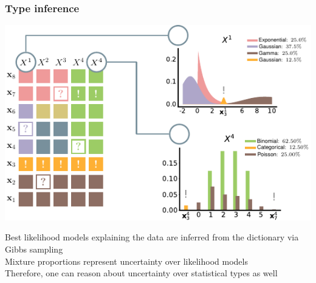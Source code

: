 \documentclass[xcolor={usenames,dvipsnames,svgnames}, compress, aspectratio=169, 11pt]{beamer}
\begin{document}
\begin{frame}[t, htt=bgrey2]
  \frametitle{Type inference}

  \large
  \begin{minipage}[t]{0.66\linewidth}
    \includegraphics[width=.99\linewidth]{figures/abda-type-inf}
  \end{minipage}\hfill\begin{minipage}[t]{0.3\linewidth}
    \vspace{-150pt}
    Best likelihood models explaining the data are inferred from the
    dictionary via Gibbs sampling\\

    Mixture proportions represent uncertainty over likelihood models\\

    Therefore, one can reason about uncertainty over statistical types
    as well\\
    
  \end{minipage}  
\end{frame}
\end{document}
